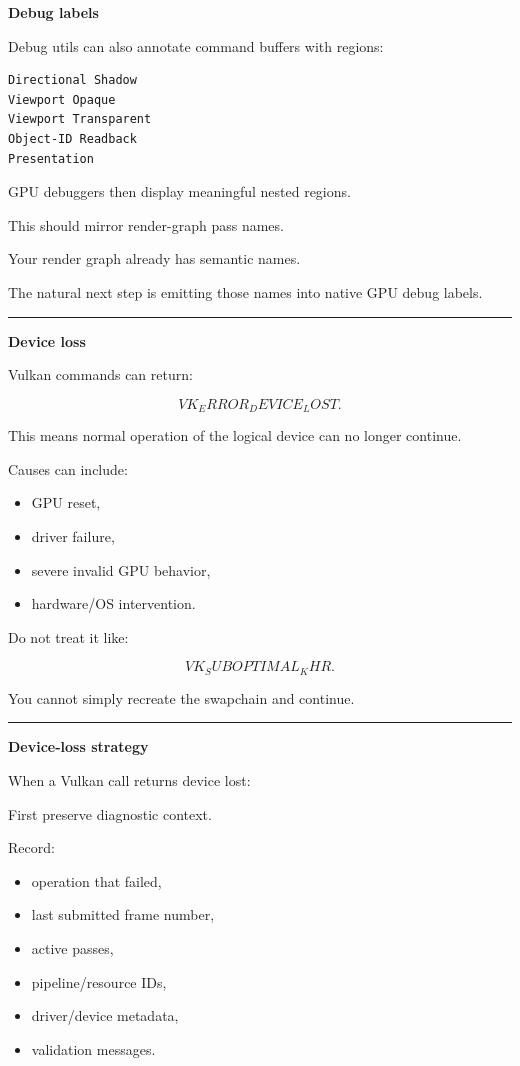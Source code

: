 \textbf{Debug labels}

Debug utils can also annotate command buffers with regions:

\begin{verbatim}
Directional Shadow
Viewport Opaque
Viewport Transparent
Object-ID Readback
Presentation
\end{verbatim}

GPU debuggers then display meaningful nested regions.

This should mirror render-graph pass names.

Your render graph already has semantic names.

The natural next step is emitting those names into native GPU debug labels.

\begin{center}\rule{0.5\linewidth}{0.5pt}\end{center}

\textbf{Device loss}

Vulkan commands can return:

\[
VK_ERROR_DEVICE_LOST.
\]

This means normal operation of the logical device can no longer continue.

Causes can include:

\begin{itemize}
\tightlist
\item
  GPU reset,
\item
  driver failure,
\item
  severe invalid GPU behavior,
\item
  hardware/OS intervention.
\end{itemize}

Do not treat it like:

\[
VK_SUBOPTIMAL_KHR.
\]

You cannot simply recreate the swapchain and continue.

\begin{center}\rule{0.5\linewidth}{0.5pt}\end{center}

\textbf{Device-loss strategy}

When a Vulkan call returns device lost:

First preserve diagnostic context.

Record:

\begin{itemize}
\tightlist
\item
  operation that failed,
\item
  last submitted frame number,
\item
  active passes,
\item
  pipeline/resource IDs,
\item
  driver/device metadata,
\item
  validation messages.
\end{itemize}

